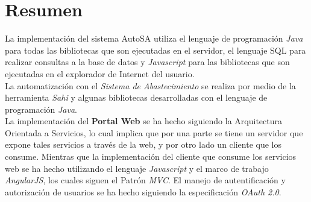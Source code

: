 %



%

\section{Resumen}
La implementación del sistema AutoSA utiliza el lenguaje de programación \textit{Java} para todas las bibliotecas que son ejecutadas en el servidor, el lenguaje SQL para realizar consultas a la base de datos y \textit{Javascript} para las bibliotecas que son ejecutadas en el explorador de Internet del usuario.\\
La automatización con el \textit{Sistema de Abastecimiento} se realiza por medio de la herramienta \textit{Sahi} y algunas bibliotecas desarrolladas con el lenguaje de programación \textit{Java}.\\
La implementación del \textbf{Portal Web} se ha hecho siguiendo la Arquitectura Orientada a Servicios, lo cual implica que por una parte se tiene un servidor que expone tales servicios a través de la web, y por otro lado un cliente que los consume. Mientras que la implementación del cliente que consume los servicios web se ha hecho utilizando el lenguaje \textit{Javascript} y el marco de trabajo \textit{AngularJS}, los cuales siguen el Patrón \textit{MVC}. El manejo de autentificación y autorización de usuarios se ha hecho siguiendo la especificación \textit{OAuth 2.0}.
